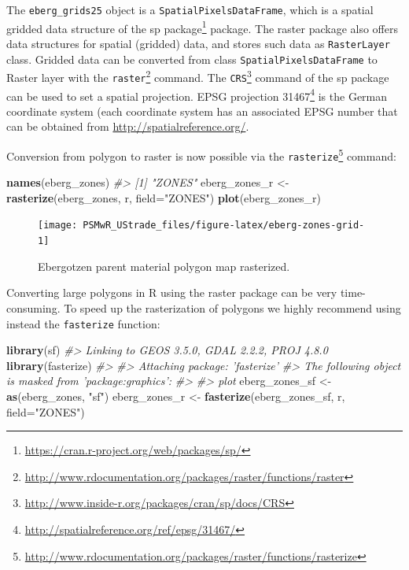 \documentclass[graybox,natbib,nospthms,UStrade]{svmono}
\newenvironment{Shaded}{\begin{snugshade}}{\end{snugshade}}
\newcommand{\CommentTok}[1]{\textcolor[rgb]{0.37,0.37,0.37}{\textit{#1}}}
\newcommand{\DataTypeTok}[1]{\textcolor[rgb]{0.27,0.27,0.27}{#1}}
\newcommand{\KeywordTok}[1]{\textcolor[rgb]{0.27,0.27,0.27}{\textbf{#1}}}
\newcommand{\NormalTok}[1]{#1}
\newcommand{\StringTok}[1]{\textcolor[rgb]{0.5,0.5,0.5}{#1}}
\renewcommand{\href}[2]{#2 (\url{#1})}
\renewcommand{\href}[2]{#2\footnote{\url{#1}}}
\begin{document}
The \texttt{eberg\_grids25} object is a \texttt{SpatialPixelsDataFrame}, which is a spatial gridded data structure of the \href{https://cran.r-project.org/web/packages/sp/}{sp package} package. The raster package also offers data structures for spatial (gridded) data, and stores such data as \texttt{RasterLayer} class. Gridded data can be converted from class \texttt{SpatialPixelsDataFrame} to Raster layer with the \href{http://www.rdocumentation.org/packages/raster/functions/raster}{\texttt{raster}} command. The
\href{http://www.inside-r.org/packages/cran/sp/docs/CRS}{\texttt{CRS}} command of the sp package can be used to set a spatial projection.
\href{http://spatialreference.org/ref/epsg/31467/}{EPSG projection 31467} is the German coordinate system (each coordinate system has an associated EPSG number that can be obtained from \url{http://spatialreference.org/}.

Conversion from polygon to raster is now possible via the \href{http://www.rdocumentation.org/packages/raster/functions/rasterize}{\texttt{rasterize}} command:

\begin{Shaded}
\begin{Highlighting}[]
\KeywordTok{names}\NormalTok{(eberg_zones)}
\CommentTok{#> [1] "ZONES"}
\NormalTok{eberg_zones_r <-}\StringTok{ }\KeywordTok{rasterize}\NormalTok{(eberg_zones, r, }\DataTypeTok{field=}\StringTok{"ZONES"}\NormalTok{)}
\KeywordTok{plot}\NormalTok{(eberg_zones_r)}
\end{Highlighting}
\end{Shaded}

\begin{figure}[H]

{\centering \texttt{[image: PSMwR\_UStrade\_files/figure-latex/eberg-zones-grid-1]} 

}

\caption{Ebergotzen parent material polygon map rasterized.}\label{fig:eberg-zones-grid}
\end{figure}

Converting large polygons in R using the raster package can be very time-consuming. To speed up the rasterization of polygons we highly recommend using instead the \texttt{fasterize} function:

\begin{Shaded}
\begin{Highlighting}[]
\KeywordTok{library}\NormalTok{(sf)}
\CommentTok{#> Linking to GEOS 3.5.0, GDAL 2.2.2, PROJ 4.8.0}
\KeywordTok{library}\NormalTok{(fasterize)}
\CommentTok{#> }
\CommentTok{#> Attaching package: 'fasterize'}
\CommentTok{#> The following object is masked from 'package:graphics':}
\CommentTok{#> }
\CommentTok{#>     plot}
\NormalTok{eberg_zones_sf <-}\StringTok{ }\KeywordTok{as}\NormalTok{(eberg_zones, }\StringTok{"sf"}\NormalTok{)}
\NormalTok{eberg_zones_r <-}\StringTok{ }\KeywordTok{fasterize}\NormalTok{(eberg_zones_sf, r, }\DataTypeTok{field=}\StringTok{"ZONES"}\NormalTok{)}
\end{Highlighting}
\end{Shaded}
\end{document}
